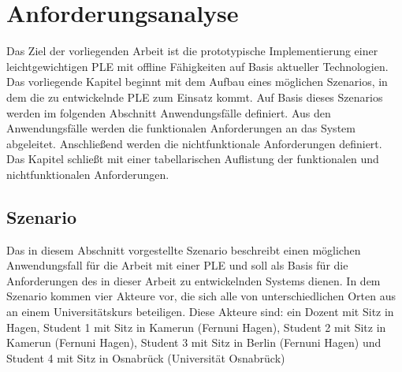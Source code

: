 \newcommand{\requirementOfflineWork}{Das System muss den Anwender in die Lage versetzen mit den gewählten Services, zumindest rudimentär, offline zu arbeiten.}
\newcommand{\requirementOnlineSync}{Bei einer Verbindung mit dem Internet müssen die offline vorgenommenen Arbeiten mit den Services synchronisiert werden.}
\newcommand{\requirementAggregator}{Das System muss als Aggregator für unterschiedliche externe Kanäle und Services dienen und dem Anwender die Arbeit mit ihnen an zentraler Stelle ermöglichen.}
\newcommand{\requirementWidgetStandard}{Die Services müssen über einen frei verfügbaren Standard in das System eingebunden werden können.}
\newcommand{\requirementUsbStick}{Die durchgeführten Arbeiten müssen offline zwischen unterschiedlichen Rechnern transportiert werden können.}
\newcommand{\requirementUsageInBrowser}{Das System muss in aktuellen Browsern mit nativen Browsertechnologien ohne weitere Installation nutzbar sein.}
\newcommand{\requirementExtensibility}{Das System muss einfach erweitert werden können.}
\newcommand{\requirementNewWidgetsWithApi}{Es muss möglich sein über eine \ac{API} oder eine vorgegebene Implementierung neue Services und Kanäle mit offline Fähigkeiten in das System zu laden.}
\newcommand{\requirementExampleWidget}{Es muss ein offline fähiges Widget entwickelt werden, welches die offline Funktionalitäten beispielhaft umsetzt.}
\newcommand{\requirementOpenSource}{Es dürfen keine proprietären, sondern nur freie Technologien für die Umsetzung des Systems genutzt werden.}

\chapter{Anforderungsanalyse}\label{chapter:Kapitel3}  

Das Ziel der vorliegenden Arbeit ist die prototypische Implementierung einer leichtgewichtigen \ac{PLE} mit offline Fähigkeiten auf Basis aktueller Technologien. Das vorliegende Kapitel beginnt mit dem Aufbau eines möglichen Szenarios, in dem die zu entwickelnde \ac{PLE} zum Einsatz kommt. Auf Basis dieses Szenarios werden im folgenden Abschnitt Anwendungsfälle definiert. Aus den Anwendungsfälle werden die funktionalen Anforderungen an das System abgeleitet. Anschließend werden die nichtfunktionale Anforderungen definiert. Das Kapitel schließt mit einer tabellarischen Auflistung der funktionalen und nichtfunktionalen Anforderungen. 

\section{Szenario}\label{section:szenario}
Das in diesem Abschnitt vorgestellte Szenario beschreibt einen möglichen Anwendungsfall für die Arbeit mit einer \ac{PLE} und soll als Basis für die Anforderungen des in dieser Arbeit zu entwickelnden Systems dienen. In dem Szenario kommen vier Akteure vor, die sich alle von unterschiedlichen Orten aus an einem Universitätskurs beteiligen. Diese Akteure sind: ein Dozent mit Sitz in Hagen, Student 1 mit Sitz in Kamerun (Fernuni Hagen), Student 2 mit Sitz in Kamerun (Fernuni Hagen), Student 3 mit Sitz in Berlin (Fernuni Hagen) und Student 4 mit Sitz in Osnabrück (Universität Osnabrück) 

